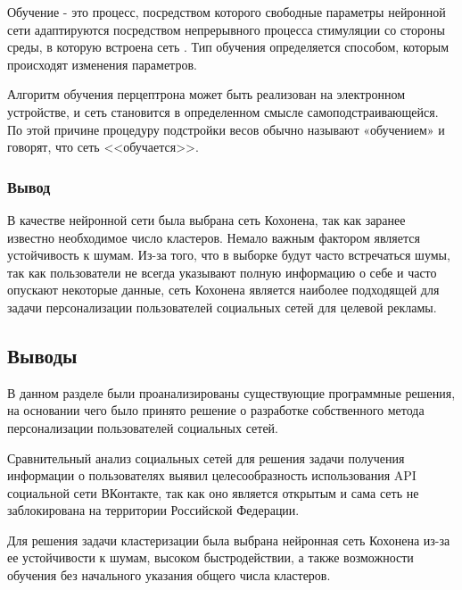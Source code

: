 Обучение - это процесс, посредством которого свободные параметры нейронной сети адаптируются посредством непрерывного процесса стимуляции со стороны среды, в которую встроена сеть \cite{ettaouil2013architecture}. Тип обучения определяется способом, которым происходят изменения параметров. 

Алгоритм обучения перцептрона может быть реализован на электронном устройстве, и сеть становится в определенном смысле самоподстраивающейся. По этой причине процедуру подстройки весов обычно называют «обучением» и говорят, что сеть <<обучается>>. 

\subsubsection{Вывод}
В качестве нейронной сети была выбрана сеть Кохонена, так как заранее известно необходимое число кластеров. Немало важным фактором является устойчивость к шумам. Из-за того, что в выборке будут часто встречаться шумы, так как пользователи не всегда указывают полную информацию о себе и часто опускают некоторые данные, сеть Кохонена является наиболее подходящей для задачи персонализации пользователей социальных сетей для целевой рекламы.

\subsection{Выводы}
В данном разделе были проанализированы существующие программные решения, на основании чего было принято решение о разработке собственного метода персонализации пользователей социальных сетей.

Сравнительный анализ социальных сетей для решения задачи получения информации о пользователях выявил целесообразность использования API социальной сети ВКонтакте, так как оно является открытым и сама сеть не заблокирована на территории Российской Федерации.

Для решения задачи кластеризации была выбрана нейронная сеть Кохонена из-за ее устойчивости к шумам, высоком быстродействии, а также возможности обучения без начального указания общего числа кластеров.


\pagebreak